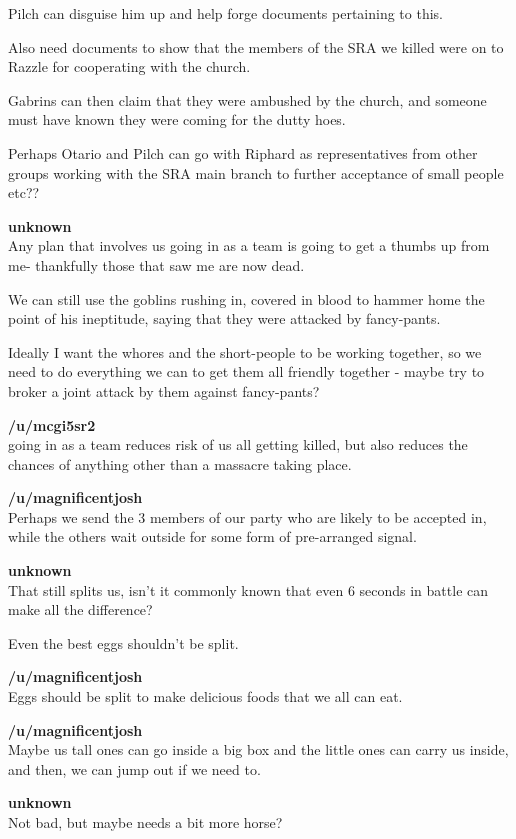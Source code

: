 Pilch can disguise him up and help forge documents pertaining to this.\medskip

Also need documents to show that the members of the SRA we killed were on to Razzle for cooperating with the church.\medskip

Gabrins can then claim that they were ambushed by the church, and someone must have known they were coming for the dutty hoes.\medskip

Perhaps Otario and Pilch can go with Riphard as representatives from other groups working with the SRA main branch to further acceptance of small people etc??\medskip

\textbf{unknown}\\
Any plan that involves us going in as a team is going to get a thumbs up from me- thankfully those that saw me are now dead.\medskip

We can still use the goblins rushing in, covered in blood to hammer home the point of his ineptitude, saying that they were attacked by fancy-pants.\medskip

Ideally I want the whores and the short-people to be working together, so we need to do everything we can to get them all friendly together - maybe try to broker a joint attack by them against fancy-pants?\medskip

\textbf{/u/mcgi5sr2}\\
going in as a team reduces risk of us all getting killed, but also reduces the chances of anything other than a massacre taking place.\medskip

\textbf{/u/magnificentjosh}\\
Perhaps we send the 3 members of our party who are likely to be accepted in, while the others wait outside for some form of pre-arranged signal.\medskip

\textbf{unknown}\\
That still splits us, isn't it commonly known that even 6 seconds in battle can make all the difference?\medskip

Even the best eggs shouldn't be split.\medskip

\textbf{/u/magnificentjosh}\\
Eggs should be split to make delicious foods that we all can eat.\medskip

\textbf{/u/magnificentjosh}\\
Maybe us tall ones can go inside a big box and the little ones can carry us inside, and then, we can jump out if we need to.\medskip

\textbf{unknown}\\
Not bad, but maybe needs a bit more horse?\medskip

